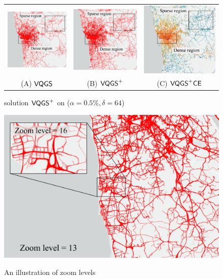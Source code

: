 \begin{figure}
   \begin{minipage}{0.65\textwidth}
     \centering
     \begin{tabular}{ccc}
     \includegraphics[width=0.22\linewidth]{pictures/motivation_VQGS}
     &
     \includegraphics[width=0.22\linewidth]{pictures/motivation_VQGS+d64}
     &
     \includegraphics[width=0.22\linewidth]{pictures/motivation_VQGS+d64CE}
     \\
     (A) $\mathsf{VQGS}$
     &
     (B) $\mathsf{VQGS}^+$
     &
     (C) $\mathsf{VQGS}^+\mathsf{CE}$
     \end{tabular}
     \trim
     \caption{\prob{} solution $\mathsf{VQGS}^+$ on \pt{} ($\alpha = 0.5\%, \delta = 64$)}\label{fig:delta}
   \end{minipage}\hfill
   \begin{minipage}{0.35\textwidth}
     \centering
     \includegraphics[width=0.73\linewidth]{pictures/zoomlevel.pdf}
     \label{Fig:zoom}
     \trim
     \caption{An illustration of zoom levels}
   \end{minipage}
   \trim
\end{figure}


